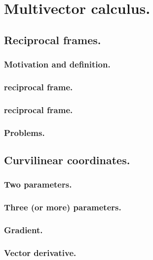 %
%
\chapter{Multivector calculus.}
   \section{Reciprocal frames.}
      \subsection{Motivation and definition.}
         
         
      \subsection{ reciprocal frame.}
         
      \subsection{ reciprocal frame.}
         
      \subsection{Problems.}
         
         
   \section{Curvilinear coordinates.}
      \subsection{Two parameters.}
         
      \subsection{Three (or more) parameters.}
         
      \subsection{Gradient.}
         
      \subsection{Vector derivative.}
         
